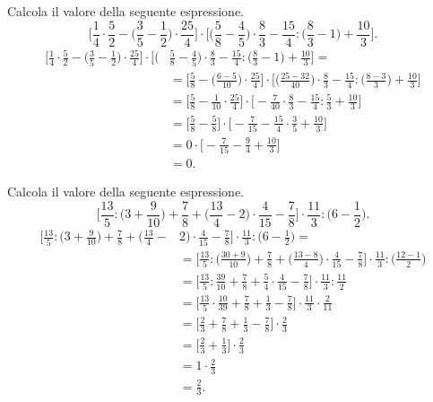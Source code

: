 \begin{esempio}
  Calcola il valore della seguente espressione.
\[\bigg[\frac{1}{4}\cdot\frac{5}{2}-\bigg(\frac{3}{5} - \frac{1}{2}\bigg)\cdot\frac{25}{4}\bigg]\cdot\bigg[\bigg(\frac{5}{8}-\frac{4}{5}\bigg)\cdot\frac{8}{3}-\frac{15}{4}:\bigg(\frac{8}{3}-1\bigg)+\frac{10}{3}\bigg].\]
  \begin{align*}
\bigg[\frac{1}{4}\cdot\frac{5}{2}-\bigg(\frac{3}{5} - \frac{1}{2}\bigg)\cdot\frac{25}{4}\bigg]\cdot\bigg[\bigg(&\frac{5}{8}-\frac{4}{5}\bigg)\cdot\frac{8}{3}-\frac{15}{4}:\bigg(\frac{8}{3}-1\bigg)+\frac{10}{3}\bigg]=\\
&=\bigg[\frac{5}{8}-\bigg(\frac{6-5}{10}\bigg)\cdot\frac{25}{4}\bigg]\cdot\bigg[\bigg(\frac{25-32}{40}\bigg)\cdot\frac{8}{3}-\frac{15}{4}:\bigg(\frac{8-3}{3}\bigg)+\frac{10}{3}\bigg]\\
&=\bigg[\frac{5}{8}-\frac{1}{10}\cdot\frac{25}{4}\bigg]\cdot\bigg[-\frac{7}{40}\cdot\frac{8}{3}-\frac{15}{4}:\frac{5}{3}+\frac{10}{3}\bigg]\\
&=\bigg[\frac{5}{8}-\frac{5}{8}\bigg]\cdot\bigg[-\frac{7}{15}-\frac{15}{4}\cdot\frac{3}{5}+\frac{10}{3}\bigg]\\
&=0\cdot\bigg[-\frac{7}{15}-\frac{9}{4}+\frac{10}{3}\bigg]\\
&=0.
  \end{align*}
\end{esempio}

\begin{esempio}
  Calcola il valore della seguente espressione.
\[\bigg[\frac{13}{5}:\bigg(3+\frac{9}{10}\bigg)+\frac{7}{8}+\bigg(\frac{13}{4}-2\bigg)\cdot\frac{4}{15}-\frac{7}{8}%
\bigg]\cdot\frac{11}{3}:\bigg(6-\frac{1}{2}\bigg).\]
  \begin{align*}
\bigg[\frac{13}{5}:\bigg(3+\frac{9}{10}\bigg)+\frac{7}{8}+\bigg(\frac{13}{4}-&2\bigg)\cdot\frac{4}{15}-\frac{7}{8}%
\bigg]\cdot\frac{11}{3}:\bigg(6-\frac{1}{2}\bigg)=\\
&=
\bigg[\frac{13}{5}:\bigg(\frac{30+9}{10}\bigg)+\frac{7}{8}+\bigg(\frac{13-8}{4}\bigg)\cdot\frac{4}{15}-\frac{7}{8}%
\bigg]\cdot\frac{11}{3}:\bigg(\frac{12-1}{2}\bigg)\\
 &=
\bigg[\frac{13}{5}:\frac{39}{10}+\frac{7}{8}+\frac{5}{4}\cdot\frac{4}{15}-\frac{7}{8}%
\bigg]\cdot\frac{11}{3}:\frac{11}{2}\\
 &=
\bigg[\frac{13}{5}\cdot\frac{10}{39}+\frac{7}{8}+\frac{1}{3}-\frac{7}{8}%
\bigg]\cdot\frac{11}{3}\cdot\frac{2}{11}\\
 &=
\bigg[\frac{2}{3}+\frac{7}{8}+\frac{1}{3}-\frac{7}{8}%
\bigg]\cdot\frac{2}{3}\\
 &=
\bigg[\frac{2}{3}+\frac{1}{3}\bigg]\cdot\frac{2}{3}\\
&=1\cdot\frac{2}{3}\\
&=\frac{2}{3}.
  \end{align*}
\end{esempio}

